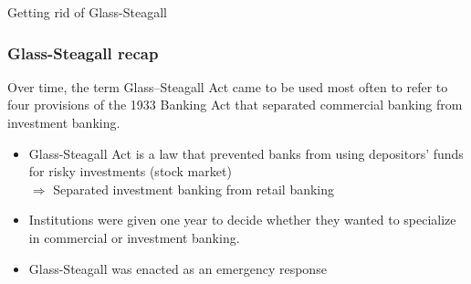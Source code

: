 \documentclass[11pt]{beamer}
\begin{document}












\begin{frame}
\begin{center}
Getting rid of Glass-Steagall
\end{center}
\end{frame}


\begin{frame}
\frametitle{Glass-Steagall recap}
Over time, the term Glass–Steagall Act came to be used most often to refer to four provisions of the 1933 Banking Act that separated commercial banking from investment banking.\\
\begin{itemize}
\item Glass-Steagall Act is a law that prevented banks from using depositors' funds for risky investments (stock market) \\$\Rightarrow$ Separated investment banking from retail banking
\item Institutions were given one year to decide whether they wanted to specialize in commercial or investment banking.
\item Glass-Steagall was enacted as an emergency response
\end{itemize}
\end{frame}
\end{document}
